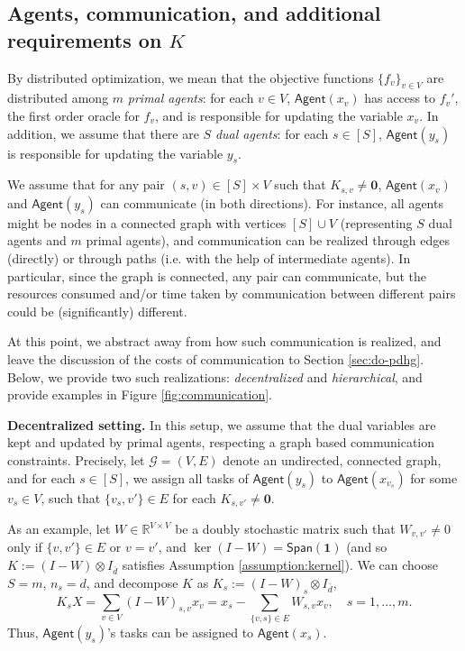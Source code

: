 \documentclass[10pt]{article}
\newcommand{\mc}{\mathcal}
\newcommand{\mb}{\mathbf}
\newcommand{\R}{\mathbb{R}}
\newcommand{\agent}{\mathsf{Agent}}
\newcommand{\setspan}{\mathsf{Span}}
\begin{document}
\subsection{Agents, communication, and additional requirements on $K$}\label{sec:agents}

By distributed optimization, we mean that the objective functions $\{f_v\}_{v\in V}$ are distributed among $m$ \textit{primal agents}: for each $v\in V$, $\agent(x_v)$ has access to $f_v'$, the first order oracle for $f_v$, and is responsible for updating the variable $x_v$. In addition, we assume that there are $S$ \textit{dual agents}: for each $s\in [S]$, $\agent(y_s)$ is responsible for updating the variable $y_s$. 

We assume that for any pair $(s,v)\in [S]\times V$ such that $K_{s,v}\neq \mb 0$, $\agent(x_v)$ and $\agent(y_s)$ can communicate (in both directions). For instance, all agents might be nodes in a connected graph with vertices $[S]\cup V$ (representing $S$ dual agents and $m$ primal agents), and communication can be realized through edges (directly) or through paths (i.e. with the help of intermediate agents). In particular, since the graph is connected, any pair can communicate, but the resources consumed and/or time taken by communication between different pairs could be (significantly) different. 

At this point, we abstract away from how such communication is realized, and leave the discussion of the costs of communication to Section \ref{sec:do-pdhg}. Below, we provide two such realizations: \textit{decentralized} and \textit{hierarchical}, and provide examples in Figure \ref{fig:communication}. 


\textbf{Decentralized setting.} In this setup, we assume that the dual variables are kept and updated by primal agents, respecting a graph based communication constraints. Precisely, let $\mc G = (V,E)$ denote an undirected, connected graph, and for each $s\in [S]$, we assign all tasks of $\agent(y_s)$ to $\agent(x_{v_s})$ for some $v_s\in V$, such that $\{v_s,v'\}\in E$ for each $K_{s,v'}\neq \mb 0$. 

As an example, let $W\in \R^{V\times V}$ be a doubly stochastic matrix such that $W_{v,v'}\neq 0$ only if $\{v,v'\}\in E$ or $v=v'$, and $\ker(I-W) = \setspan(\mb 1)$ (and so $K:=(I-W)\otimes I_{\overline{d}}$ satisfies Assumption \ref{assumption:kernel}). We can choose $S = m$, $n_s = d$, and decompose $K$ as $K_s:=(I-W)_s\otimes I_{\overline{d}}$, 
\begin{displaymath}
    K_sX = \sum_{v\in V} (I-W)_{s,v}x_v = x_s-\sum_{\{v, s\}\in E}W_{s,v}x_v, \quad s = 1,\ldots,m.
\end{displaymath}
Thus, $\agent(y_s)$'s tasks can be assigned to $\agent(x_s)$. 
\end{document}
